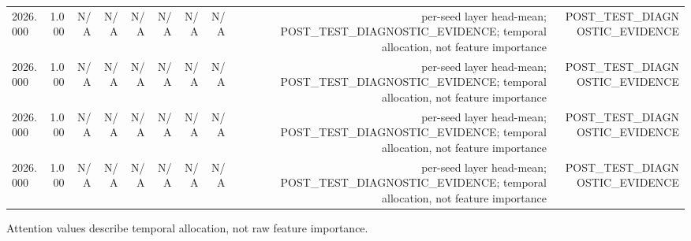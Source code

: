 \begin{table}[h!]
\begin{tabular}{lrrrrrrrrr}
2026.000 & 1.000 & N/A & N/A & N/A & N/A & N/A & N/A & per-seed layer head-mean; POST\_TEST\_DIAGNOSTIC\_EVIDENCE; temporal allocation, not feature importance & POST\_TEST\_DIAGNOSTIC\_EVIDENCE \\
2026.000 & 1.000 & N/A & N/A & N/A & N/A & N/A & N/A & per-seed layer head-mean; POST\_TEST\_DIAGNOSTIC\_EVIDENCE; temporal allocation, not feature importance & POST\_TEST\_DIAGNOSTIC\_EVIDENCE \\
2026.000 & 1.000 & N/A & N/A & N/A & N/A & N/A & N/A & per-seed layer head-mean; POST\_TEST\_DIAGNOSTIC\_EVIDENCE; temporal allocation, not feature importance & POST\_TEST\_DIAGNOSTIC\_EVIDENCE \\
2026.000 & 1.000 & N/A & N/A & N/A & N/A & N/A & N/A & per-seed layer head-mean; POST\_TEST\_DIAGNOSTIC\_EVIDENCE; temporal allocation, not feature importance & POST\_TEST\_DIAGNOSTIC\_EVIDENCE \\
\bottomrule
\end{tabular}
\vspace{4pt}
\footnotesize{Attention values describe temporal allocation, not raw feature importance.}\\
\end{table}
